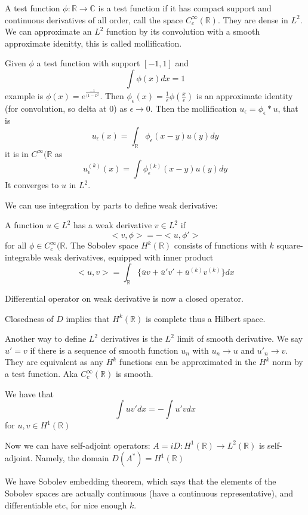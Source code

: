 \documentclass[main.tex]{subfiles}
\begin{document}
A test function $\phi: \mathbb{R} \rightarrow \mathbb{C}$ is a test function if it has compact support and continuous derivatives of all order, call the space $C^\infty _c(\mathbb{R})$. They are dense in $L^2$. We can approximate an $L^2$ function by its convolution with a smooth approximate idenitty, this is called mollification.

Given $\phi$ a test function with support $[-1, 1]$ and 
$$
\int \phi(x) dx = 1
$$
example is $\phi(x) = e^{\frac{-1}{(1-x^2}}$. 
Then $\phi_\epsilon(x) = \frac{1}{\epsilon} \phi(\frac{x}{\epsilon})$ is an approximate identity (for convolution, so delta at $0$) as $\epsilon \rightarrow 0$.  Then the mollification $u_\epsilon = \phi_\epsilon * u$, that is 
$$
u_\epsilon(x) = \int_\mathbb{R} \phi_\epsilon(x-y) u(y) dy
$$
it is in $C^\infty(\mathbb{R}$ as 
$$
u^{(k)} _\epsilon (x) = \int \phi^{(k)} _\epsilon (x-y) u(y) dy
$$
It converges to $u$ in $L^2$.

We can use integration by parts to define weak derivative:

\begin{theorem}
A function $u \in L^2$ has a weak derivative $v \in L^2$ if 
$$
<v, \phi> = -<u, \phi'> 
$$ for all $\phi \in C^\infty _c (\mathbb{R}$. 
The Sobolev space $H^k(\mathbb{R})$ consists of functions with $k$ square-integrable weak derivatives, equipped with inner product
$$
<u,v> = \int_\mathbb{R} \{\overline{u}v + \overline{u}' v' + \overline{u}^{(k)} v^{(k)} \} dx
$$
\end{theorem}

Differential operator on weak derivative is now a closed operator.

Closedness of $D$ implies that $H^k(\mathbb{R})$ is complete thus a Hilbert space.

Another way to define $L^2$ derivatives is the $L^2$ limit of smooth derivative. We say $u' = v$ if there is a sequence of smooth function $u_n$ with $u_n \rightarrow u$ and $u' _n \rightarrow v$. They are equivalent as any $H^k$ functions can be approximated in the $H^k$ norm by a test function. Aka $C^\infty _c (\mathbb{R})$ is smooth.

We have that 
$$
\int u v' dx = - \int u' v dx
$$
for $u, v \in H^1(\mathbb{R})$

Now we can have self-adjoint operators: $A = iD: H^1(\mathbb{R}) \rightarrow L^2(\mathbb{R})$ is self-adjoint. Namely, the domain $D(A^*) = H^1(\mathbb{R})$

We have Sobolev embedding theorem, which says that the elements of the Sobolev spaces are actually continuous (have a continuous representative), and differentiable etc, for nice enough $k$.
\end{document}

